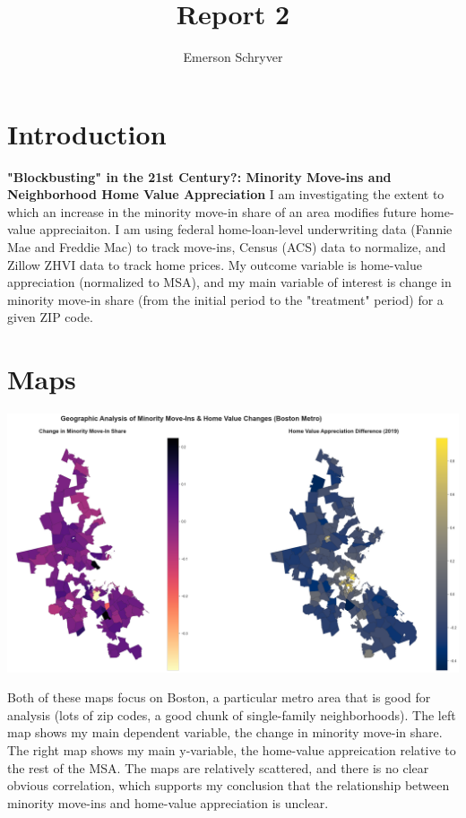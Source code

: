 \documentclass{article}
\title{Report 2}
\author{Emerson Schryver}
\begin{document}
\maketitle
\section{Introduction}
\textbf{"Blockbusting" in the 21st Century?: Minority Move-ins and Neighborhood Home Value Appreciation}
I am investigating the extent to which an increase in the minority move-in share of an area modifies future home-value appreciaiton. I am using federal home-loan-level underwriting data (Fannie Mae and Freddie Mac) to track move-ins, Census (ACS) data to normalize, and Zillow ZHVI data to track home prices. My outcome variable is home-value appreciation (normalized to MSA), and my main variable of interest is change in minority move-in share (from the initial period to the "treatment" period) for a given ZIP code. 
\section{Maps}
\includegraphics[width=\textwidth]{map.png}

Both of these maps focus on Boston, a particular metro area that is good for analysis (lots of zip codes, a good chunk of single-family neighborhoods). The left map shows my main dependent variable, the change in minority move-in share. The right map shows my main y-variable, the home-value appreication relative to the rest of the MSA. The maps are relatively scattered, and there is no clear obvious correlation, which supports my conclusion that the relationship between minority move-ins and home-value appreciation is unclear.
\end{document}
